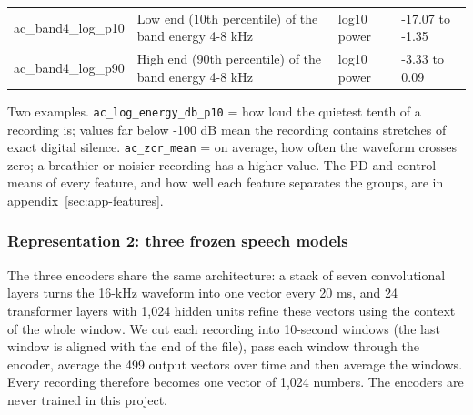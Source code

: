 \documentclass[11pt,a4paper]{article}
\begin{document}
\begin{center}
\begin{longtable}{>{\raggedright\arraybackslash}p{3.70cm}>{\raggedright\arraybackslash}p{6.65cm}>{\raggedright\arraybackslash}p{1.90cm}>{\raggedright\arraybackslash}p{2.56cm}}
\hspace{0pt}ac\_\allowbreak{}band4\_\allowbreak{}log\_\allowbreak{}p10 & \hspace{0pt}Low end (10th percentile) of the band energy 4-8 kHz & \hspace{0pt}log10 power & \hspace{0pt}-17.07 to -1.35\\
\hspace{0pt}ac\_\allowbreak{}band4\_\allowbreak{}log\_\allowbreak{}p90 & \hspace{0pt}High end (90th percentile) of the band energy 4-8 kHz & \hspace{0pt}log10 power & \hspace{0pt}-3.33 to 0.09\\
\end{longtable}\end{center}
\begin{tcolorbox}[colback=green!3,colframe=green!40!black,boxrule=0.5pt,arc=2pt,left=5pt,right=5pt,top=3pt,bottom=3pt,title={\small\bfseries In plain words}]\small Two examples. \texttt{ac\_\allowbreak{}log\_\allowbreak{}energy\_\allowbreak{}db\_\allowbreak{}p10} = how loud the quietest tenth of a recording is; values far below -100 dB mean the recording contains stretches of exact digital silence. \texttt{ac\_\allowbreak{}zcr\_\allowbreak{}mean} = on average, how often the waveform crosses zero; a breathier or noisier recording has a higher value. The PD and control means of every feature, and how well each feature separates the groups, are in appendix~\ref{sec:app-features}.\end{tcolorbox}
\subsubsection{Representation 2: three frozen speech models}
The three encoders share the same architecture: a stack of seven convolutional layers turns the 16-kHz waveform into one vector every 20 ms, and 24 transformer layers with 1,024 hidden units refine these vectors using the context of the whole window. We cut each recording into 10-second windows (the last window is aligned with the end of the file), pass each window through the encoder, average the 499 output vectors over time and then average the windows. Every recording therefore becomes one vector of 1,024 numbers. The encoders are never trained in this project.
\end{document}
